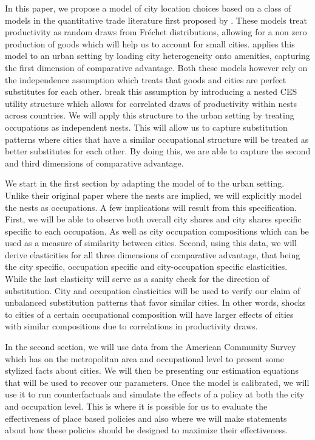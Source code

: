 \documentclass[10pt]{article}
\begin{document}
In this paper, we propose a model of city location choices based on a class of models in the quantitative trade literature first proposed by \cite{ek}. These models treat productivity as random draws from Fr\'{e}chet distributions, allowing for a non zero production of goods which will help us to account for small cities. \cite{redding} applies this model to an urban setting by loading city heterogeneity onto amenities, capturing the first dimension of comparative advantage. Both these models however rely on the independence assumption which treats that goods and cities are perfect substitutes for each other. \cite{lindandramondo} break this assumption by introducing a nested CES utility structure which allows for correlated draws of productivity within nests across countries. We will apply this structure to the urban setting by treating occupations as independent nests. This will allow us to capture substitution patterns where cities that have a similar occupational structure will be treated as better substitutes for each other. By doing this, we are able to capture the second and third dimensions of comparative advantage.

We start in the first section by adapting the model of \cite{lindandramondo} to the urban setting. Unlike their original paper where the nests are implied, we will explicitly model the nests as occupations. A few implications will result from this specification. First, we will be able to observe both overall city shares and city shares specific specific to each occupation. As well as city occupation compositions which can be used as a measure of similarity between cities. Second, using this data, we will derive elasticities for all three dimensions of comparative advantage, that being the city specific, occupation specific and city-occupation specific elasticities. While the last elasticity will serve as a sanity check for the direction of substitution. City and occupation elasticities will be used to verify our claim of unbalanced substitution patterns that favor similar cities. In other words, shocks to cities of a certain occupational composition will have larger effects of cities with similar compositions due to correlations in productivity draws.

In the second section, we will use data from the American Community Survey which has on the metropolitan area and occupational level to present some stylized facts about cities. We will then be presenting our estimation equations that will be used to recover our parameters. Once the model is calibrated, we will use it to run counterfactuals and simulate the effects of a policy at both the city and occupation level. This is where it is possible for us to evaluate the effectiveness of place based policies and also where we will make statements about how these policies should be designed to maximize their effectiveness.
\end{document}
